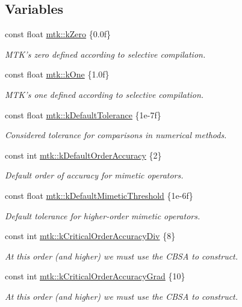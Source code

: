 \subsection*{Variables}
\begin{DoxyCompactItemize}
\item 
const float \hyperlink{group__c01-roots_ga59a451a5fae30d59649bcda274fea271}{mtk\+::k\+Zero} \{0.\+0f\}
\begin{DoxyCompactList}\small\item\em M\+T\+K's zero defined according to selective compilation. \end{DoxyCompactList}\item 
const float \hyperlink{group__c01-roots_ga26407c24d43b6b95480943340d285c71}{mtk\+::k\+One} \{1.\+0f\}
\begin{DoxyCompactList}\small\item\em M\+T\+K's one defined according to selective compilation. \end{DoxyCompactList}\item 
const float \hyperlink{group__c01-roots_gae914b125d81d1b97e0aee7bbc7739786}{mtk\+::k\+Default\+Tolerance} \{1e-\/7f\}
\begin{DoxyCompactList}\small\item\em Considered tolerance for comparisons in numerical methods. \end{DoxyCompactList}\item 
const int \hyperlink{group__c01-roots_ga0d95560098eb36420511103637b6952f}{mtk\+::k\+Default\+Order\+Accuracy} \{2\}
\begin{DoxyCompactList}\small\item\em Default order of accuracy for mimetic operators. \end{DoxyCompactList}\item 
const float \hyperlink{group__c01-roots_ga35718d949bdc81a08a9cc8ebbe3478a2}{mtk\+::k\+Default\+Mimetic\+Threshold} \{1e-\/6f\}
\begin{DoxyCompactList}\small\item\em Default tolerance for higher-\/order mimetic operators. \end{DoxyCompactList}\item 
const int \hyperlink{group__c01-roots_ga0898eef2108473e44a5223932d571c31}{mtk\+::k\+Critical\+Order\+Accuracy\+Div} \{8\}
\begin{DoxyCompactList}\small\item\em At this order (and higher) we must use the C\+B\+S\+A to construct. \end{DoxyCompactList}\item 
const int \hyperlink{group__c01-roots_ga295dd2f403c775ecd942c22b5a777496}{mtk\+::k\+Critical\+Order\+Accuracy\+Grad} \{10\}
\begin{DoxyCompactList}\small\item\em At this order (and higher) we must use the C\+B\+S\+A to construct. \end{DoxyCompactList}\end{DoxyCompactItemize}


